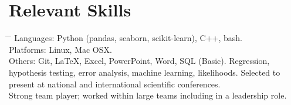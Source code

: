 \documentclass[10pt]{article} %
\begin{document}
\vspace{-1mm}
\section{Relevant Skills}
\begin{tabbing}
  \hspace{3mm} \= \hspace{30mm} \= \kill 
        {
          Languages: Python (pandas, seaborn, scikit-learn), C++, bash. \\
          \>\>Platforms: Linux, Mac OSX. \\
          \>\>Others: Git, LaTeX, Excel, PowerPoint, Word, SQL (Basic).
        }
    { Regression, hypothesis testing, error analysis, machine learning, likelihoods. }
        {
          Selected to present at national and international scientific conferences.\\
          \>\>Strong team player; worked within large teams including in a leadership role.
        }
\end{tabbing}


\vspace{-9mm}
\end{document}
